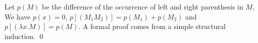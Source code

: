 \begin{pf} \rm
  Let $p(M)$ be the difference of the occurrence of left and right parenthesis in $M$,
  We have $p(x) = 0$, $p[(M_1M_2)] = p(M_1) + p(M_2)$ and
  $p[ (\lambda x.M) ] = p(M)$. A formal proof comes from a simple structural induction. \qed
\end{pf}
